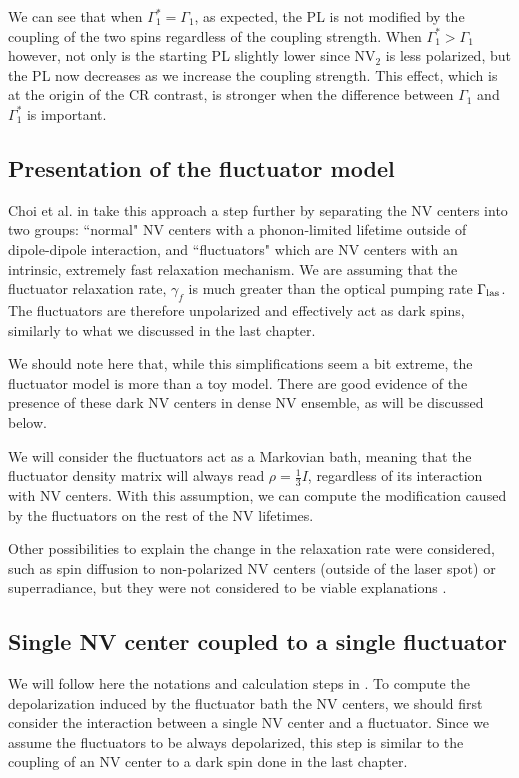 \documentclass[a4paper,11pt]{report}
\begin{document}
We can see that when $\Gamma_1^*=\Gamma_1$, as expected, the PL is not modified by the coupling of the two spins regardless of the coupling strength. When $\Gamma_1^*>\Gamma_1$ however, not only is the starting PL slightly lower since NV$_2$ is less polarized, but the PL now decreases as we increase the coupling strength. This effect, which is at the origin of the CR contrast, is stronger when the difference between $\Gamma_1$ and $\Gamma_1^*$ is important.

\subsection{Presentation of the fluctuator model}
Choi et al. in \citep{choi2017depolarization} take this approach a step further by separating the NV centers into two groups: ``normal" NV centers with a phonon-limited lifetime outside of dipole-dipole interaction, and ``fluctuators" which are NV centers with an intrinsic, extremely fast relaxation mechanism. We are assuming that the fluctuator relaxation rate, $\gamma_f$ is much greater than the optical pumping rate $\Gamma_{\rm las}$. The fluctuators are therefore unpolarized and effectively act as dark spins, similarly to what we discussed in the last chapter.

We should note here that, while this simplifications seem a bit extreme, the fluctuator model is more than a toy model. There are good evidence of the presence of these dark NV centers in dense NV ensemble, as will be discussed below.

We will consider the fluctuators act as a Markovian bath, meaning that the fluctuator density matrix will always read $\rho = \frac{1}{3} I$, regardless of its interaction with NV centers. With this assumption, we can compute the modification caused by the fluctuators on the rest of the NV lifetimes.

Other possibilities to explain the change in the relaxation rate were considered, such as spin diffusion to non-polarized NV centers (outside of the laser spot) or superradiance, but they were not considered to be viable explanations \citep{choi2017depolarization}.

\subsection{Single NV center coupled to a single fluctuator}
We will follow here the notations and calculation steps in \citep{choi2017depolarization}. To compute the depolarization induced by the fluctuator bath the NV centers, we should first consider the interaction between a single NV center and a fluctuator. Since we assume the fluctuators to be always depolarized, this step is similar to the coupling of an NV center to a dark spin done in the last chapter.
\end{document}

